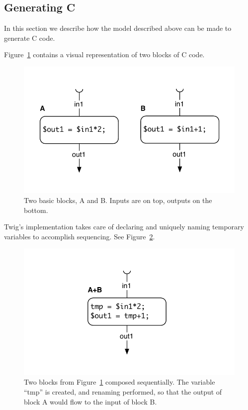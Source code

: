 \subsection{Generating C}
\label{sec:code-gen:c}

In this section we describe how the model described above can be made to generate C code.

Figure~\ref{fig:blocks} contains a visual representation of two blocks of C code.

\begin{figure}[ht]
\centering
\includegraphics[width=0.75\columnwidth]{images/code-gen1}
\caption{Two basic blocks, A and B. Inputs are on top, outputs on the bottom.}
\label{fig:blocks}
\end{figure}

Twig's implementation takes care of declaring and uniquely naming temporary variables to accomplish sequencing. See Figure~\ref{fig:codegen-seq}.

\begin{figure}[ht]
\centering
\includegraphics[width=0.75\columnwidth]{images/code-gen2}
\caption{Two blocks from Figure~\ref{fig:blocks} composed sequentially. The variable ``tmp'' is created, and renaming performed, so that the output of block A would flow to the input of block B.}
\label{fig:codegen-seq}
\end{figure}

